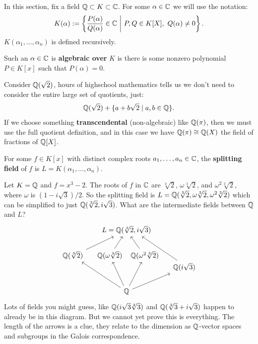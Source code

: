 \documentclass{article}
\begin{document}
In this section, fix a field $\mathbb{Q}\subset K \subset \mathbb{C}$. For some $\alpha\in \mathbb{C}$ we will use the notation: \[
K(\alpha) := \left\{
    \frac{P(\alpha)}{Q(\alpha)} \in \bC \ \middle| \ P,Q\in K[X], \ Q(\alpha)\neq 0
\right\}.
\]
$K(\alpha_1,\ldots,\alpha_n)$ is defined recursively.

\begin{definition}
    Such an $\alpha\in \mathbb{C}$ is \textbf{algebraic over} $K$ is there is some nonzero polynomial $P\in K[x]$ such that $P(\alpha) = 0$.
\end{definition}

Consider $\mathbb{Q}(\sqrt{2})$, hours of highschool mathematics tells us we don't need to consider the entire large set of quotients, just: \[
\mathbb{Q}(\sqrt{2}) + \{a + b\sqrt{2} \mid a,b\in\mathbb{Q}\}.
\]
If we choose something \textbf{transcendental} (non-algebraic) like $\mathbb{Q}(\pi)$, then we must use the full quotient definition, and in this case we have $\mathbb{Q}(\pi)\cong \mathbb{Q}(X)$ the field of fractions of $\mathbb{Q}[X]$.

\begin{definition}
    For some $f\in K[x]$ with distinct complex roots $a_1,\ldots,a_n\in\mathbb{C}$, the \textbf{splitting field} of $f$ is $L=K(\alpha_1,\ldots,\alpha_n)$.
\end{definition}

Let $K=\mathbb{Q}$ and $f=x^3-2$. The roots of $f$ in $\mathbb{C}$ are $\sqrt[3]{2}$, $\omega \sqrt[3]{2}$, and $\omega^2\sqrt[3]{2}$, where $\omega$ is $(1-i\sqrt{3})/2$. So the splitting field is $L=\mathbb{Q}(\sqrt[3]{2},\omega\sqrt[3]{2},\omega^2\sqrt[3]{2})$ which can be simplified to just $\mathbb{Q}(\sqrt[3]{2},i\sqrt{3})$. What are the intermediate fields between $\mathbb{Q}$ and $L$? 
\vspace{-10pt}
\[
\begin{tikzcd}[column sep=small]
& &[-50pt] L = \bQ(\sqrt[3]{2},i\sqrt{3})\\
\bQ(\sqrt[3]{2}) \arrow[urr] 
& \bQ(\omega\sqrt[3]{2}) \arrow[ur] 
& &[-50pt] \bQ(\omega^2\sqrt[3]{2}) \arrow[ul]\\[-20pt]
& & & & \bQ(i\sqrt{3})\arrow[uull, end anchor={[xshift=-4ex]south east}]\\
& & \bQ \arrow[uull] \arrow[uul] \arrow[uur] \arrow[urr]
\end{tikzcd}
\] Lots of fields you might guess, like $\mathbb{Q}(i\sqrt{3}\sqrt[2]{3})$ and $\mathbb{Q}(\sqrt[2]{3} + i\sqrt{3})$ happen to already be in this diagram. But we cannot yet prove this is everything. The length of the arrows is a clue, they relate to the dimension as $\mathbb{Q}$-vector spaces and subgroups in the Galois correspondence.
\end{document}
